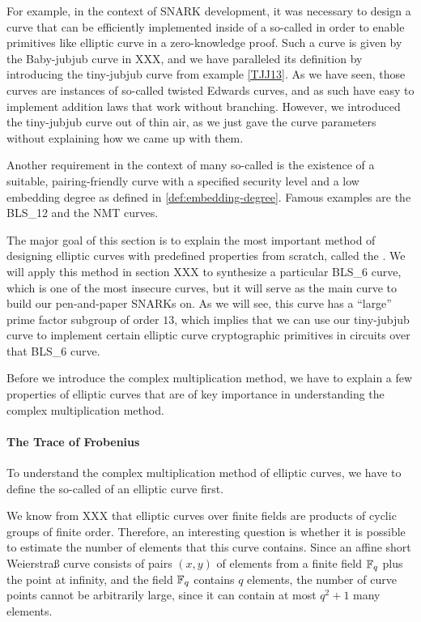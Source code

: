 For example, in the context of SNARK development, it was necessary to design a curve that can be efficiently implemented inside of a so-called  in order to enable primitives like elliptic curve  in a zero-knowledge proof. Such a curve is given by the Baby-jubjub curve in XXX, and we have paralleled its definition by introducing the tiny-jubjub curve from example \ref{TJJ13}. As we have seen, those curves are instances of so-called twisted Edwards curves, and as such have easy to implement addition laws that work without branching. However, we introduced the tiny-jubjub curve out of thin air, as we just gave the curve parameters without explaining how we came up with them.

Another requirement in the context of many so-called  is the existence of a suitable, pairing-friendly curve with a specified security level and a low embedding degree as defined in \ref{def:embedding-degree}. Famous examples are the BLS\_12 and the NMT curves.

The major goal of this section is to explain the most important method of designing elliptic curves with predefined properties from scratch, called the . We will apply this method in section XXX to synthesize a particular BLS\_6 curve, which is one of the most insecure curves, but it will serve as the main curve to build our pen-and-paper SNARKs on. As we will see, this curve has a ``large'' prime factor subgroup of order $13$, which implies that we can use our tiny-jubjub curve to implement certain elliptic curve cryptographic primitives in circuits over that BLS\_6 curve. 
 
Before we introduce the complex multiplication method, we have to explain a few properties of elliptic curves that are of key importance in understanding the complex multiplication method. 

\paragraph{The Trace of Frobenius} To understand the complex multiplication method of elliptic curves, we have to define the so-called  of an elliptic curve first.

We know from XXX that elliptic curves over finite fields are products of cyclic groups of finite order. Therefore, an interesting question is whether it is possible to estimate the number of elements that this curve contains. Since an affine short Weierstraß curve consists of pairs $(x,y)$ of elements from a finite field $\mathbb{F}_q$ plus the point at infinity, and the field $\mathbb{F}_q$ contains $q$ elements, the number of curve points cannot be arbitrarily large, since it can contain at most $q^2+1$ many elements. 

